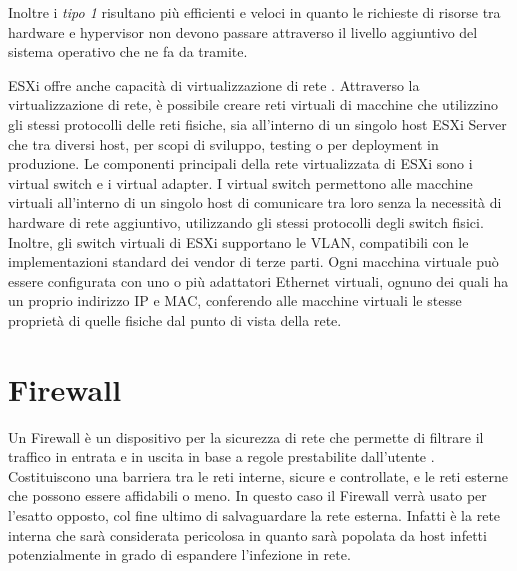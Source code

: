 Inoltre i \textit{tipo 1} risultano più efficienti e veloci in quanto le richieste di risorse tra hardware e hypervisor non devono passare attraverso il livello aggiuntivo del sistema operativo che ne fa da tramite.

ESXi offre anche  capacità di virtualizzazione di rete \cite{esxiVirtualNetwork}.
Attraverso la virtualizzazione di rete, è possibile creare reti virtuali di macchine che utilizzino gli stessi protocolli delle reti fisiche, sia all'interno di un singolo host ESXi Server che tra diversi host, per scopi di sviluppo, testing o per deployment in produzione. 
Le componenti principali della rete virtualizzata di ESXi sono i virtual switch e i virtual adapter.
I virtual switch permettono alle macchine virtuali all'interno di un singolo host di comunicare tra loro senza la necessità di hardware di rete aggiuntivo, utilizzando gli stessi protocolli degli switch fisici. Inoltre, gli switch virtuali di ESXi  supportano le VLAN, compatibili con le implementazioni standard dei vendor di terze parti.  Ogni macchina virtuale può essere configurata con uno o più adattatori Ethernet virtuali, ognuno dei quali ha un proprio indirizzo IP e MAC, conferendo alle macchine virtuali le stesse proprietà di quelle fisiche dal punto di vista della rete.


\section{Firewall}
\label{firewall}
Un Firewall è un dispositivo per la sicurezza di rete che permette di filtrare il traffico in entrata e in uscita in base a regole prestabilite dall'utente \cite{krit2017overview}.
Costituiscono una barriera tra le reti interne, sicure e controllate, e le reti esterne che possono essere affidabili o meno. 
In questo caso il Firewall verrà usato per l'esatto opposto, col fine ultimo di salvaguardare la rete esterna. Infatti è la rete interna che sarà considerata pericolosa in quanto sarà popolata da host infetti potenzialmente in grado di espandere l'infezione in rete.

